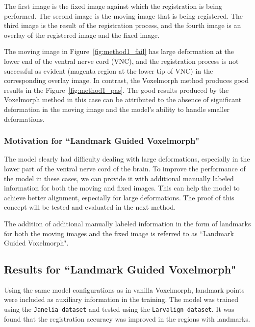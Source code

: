\documentclass{book}
\begin{document}
	The first image is the fixed image against which the registration is being performed. The second image is the moving image that is being registered. The third image is the result of the registration process, and the fourth image is an overlay of the registered image and the fixed image.
	
	The moving image in Figure~\ref{fig:method1_fail} has large deformation at the lower end of the ventral nerve cord (VNC), and the registration process is not successful as evident (magenta region at the lower tip of VNC) in the corresponding overlay image. In contrast, the Voxelmorph method produces good results in the Figure~\ref{fig:method1_pas}. The good results produced by the Voxelmorph method in this case can be attributed to the absence of significant deformation in the moving image and the model's ability to handle smaller deformations.

	
	\subsubsection{Motivation for ``Landmark Guided Voxelmorph"} \label{subsec:motivation_for_method2}
	The model clearly had difficulty dealing with large deformations, especially in the lower part of the ventral nerve cord of the brain. To improve the performance of the model in these cases, we can provide it with additional manually labeled information for both the moving and fixed images. This can help the model to achieve better alignment, especially for large deformations. The proof of this concept will be tested and evaluated in the next method.
	
	The addition of additional manually labeled information in the form of landmarks for both the moving images and the fixed image is referred to as ``Landmark Guided Voxelmorph".
	
	\subsection{Results for ``Landmark Guided Voxelmorph"}
	Using the same model configurations as in vanilla Voxelmorph, landmark points were included as auxiliary information in the training. The model was trained using the \texttt{Janelia dataset} and tested using the \texttt{Larvalign dataset}. It was found that the registration accuracy was improved in the regions with landmarks.
	
\end{document}

